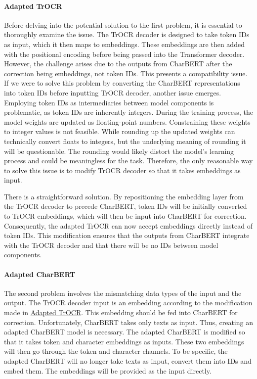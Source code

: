 \paragraph*{Adapted TrOCR}
\label{par:3_adapted_trocr}
Before delving into the potential solution to the first problem, it is essential to thoroughly examine the issue. The TrOCR decoder is designed to take token IDs as input, which it then maps to embeddings. These embeddings are then added with the positional encoding before being passed into the Transformer decoder. However, the challenge arises due to the outputs from CharBERT after the correction being embeddings, not token IDs. This presents a compatibility issue. If we were to solve this problem by converting the CharBERT representations into token IDs before inputting TrOCR decoder, another issue emerges. Employing token IDs as intermediaries between model components is problematic, as token IDs are inherently integers. During the training process, the model weights are updated as floating-point numbers. Constraining these weights to integer values is not feasible. While rounding up the updated weights can technically convert floats to integers, but the underlying meaning of rounding it will be questionable. The rounding would likely distort the model's learning process and could be meaningless for the task. Therefore, the only reasonable way to solve this issue is to modify TrOCR decoder so that it takes embeddings as input. 

There is a straightforward solution. By repositioning the embedding layer from the TrOCR decoder to precede CharBERT, token IDs will be initially converted to TrOCR embeddings, which will then be input into CharBERT for correction. Consequently, the adapted TrOCR can now accept embeddings directly instead of token IDs. This modification ensures that the outputs from CharBERT integrate with the TrOCR decoder and that there will be no IDs between model components.

\paragraph*{Adapted CharBERT}
\label{par:3_adapted_charbert}
The second problem involves the mismatching data types of the input and the output. The TrOCR decoder input is an embedding according to the modification made in \hyperref[par:3_adapted_trocr]{Adapted TrOCR}. This embedding should be fed into CharBERT for correction. Unfortunately, CharBERT takes only texts as input. Thus, creating an adapted CharBERT model is necessary. The adapted CharBERT is modified so that it takes token and character embeddings as inputs. These two embeddings will then go through the token and character channels. To be specific, the adapted CharBERT will no longer take texts as input, convert them into IDs and embed them. The embeddings will be provided as the input directly.

